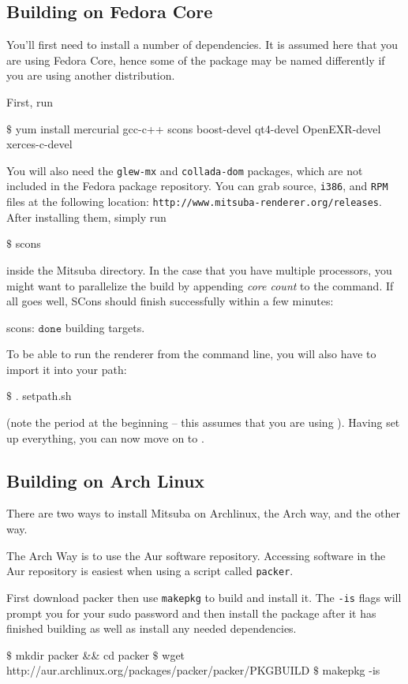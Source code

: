 \subsection{Building on Fedora Core}
You'll first need to install a number of dependencies. It is assumed here
that you are using Fedora Core, hence some of the package may be named differently if you are 
using another distribution.

First, run
\begin{shell}
$\text{\$}$ yum install mercurial gcc-c++ scons boost-devel qt4-devel OpenEXR-devel xerces-c-devel
\end{shell}
You will also need the \texttt{glew-mx} and \texttt{collada-dom} packages, which are not included in the Fedora package repository. 
You can grab source, \texttt{i386}, and  \texttt{RPM} files at the following location: \texttt{http://www.mitsuba-renderer.org/releases}.
After installing them, simply run
\begin{shell}
$\text{\$}$ scons
\end{shell}
inside the Mitsuba directory. In the case that you have multiple processors, you might want to parallelize the build by appending \emph{core count} to the command.
If all goes well, SCons should finish successfully within a few minutes:
\begin{shell}
scons: $\texttt{done}$ building targets.
\end{shell}
To be able to run the renderer from the command line, you will also have to import it into your path:
\begin{shell}
$\text{\$}$ . setpath.sh
\end{shell}
(note the period at the beginning -- this assumes that you are using ).
Having set up everything, you can now move on to .

\subsection{Building on Arch Linux}
There are two ways to install Mitsuba on Archlinux, the Arch way, and the other way.

The Arch Way is to use the Aur software repository. 
Accessing software in the Aur repository is easiest when using a script called \texttt{packer}.

First download packer then use \texttt{makepkg} to build and install it. 
The \texttt{-is} flags will prompt you for your sudo password and then install the package after it has finished building as well as install any needed dependencies.
\begin{shell}
$\text{\$}$ mkdir packer && cd packer
$\text{\$}$ wget http://aur.archlinux.org/packages/packer/packer/PKGBUILD
$\text{\$}$ makepkg -is
\end{shell}


